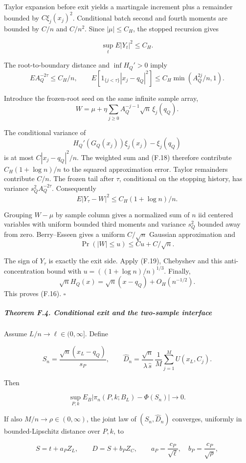 Taylor expansion before exit yields a martingale increment plus a
remainder bounded by \(C\xi_j(x_j)^2\). Conditional batch second and
fourth moments are bounded by \(C/n\) and \(C/n^2\). Since
\(|\mu|\le C_H\), the stopped recursion gives

\[
\sup_t E|Y_t|^2\le C_H.
\]

The root-to-boundary distance and \(\inf H_Q'>0\) imply \[
EA_Q^{-2\tau}\le C_H/n,\qquad
E[1_{\{j<\tau\}}|x_j-q_Q|^2]
\le C_H\min(A_Q^{2j}/n,1).
\tag{F.18}
\]

Introduce the frozen-root seed on the same infinite sample array, \[
W=\mu+\eta\sum_{j\ge0}A_Q^{-j-1}\sqrt n\,\xi_j(q_Q).
\]

The conditional variance of \[
H_Q'(G_Q(x_j))\xi_j(x_j)-\xi_j(q_Q)
\] is at most \(C|x_j-q_Q|^2/n\). The weighted sum and (F.18) therefore
contribute \(C_H(1+\log n)/n\) to the squared approximation error.
Taylor remainders contribute \(C/n\). The frozen tail after \(\tau\),
conditional on the stopping history, has variance \(s_Q^2A_Q^{-2\tau}\).
Consequently \[
E|Y_\tau-W|^2\le C_H(1+\log n)/n.
\tag{F.19}
\]

Grouping \(W-\mu\) by sample column gives a normalized sum of \(n\) iid
centered variables with uniform bounded third moments and variance
\(s_Q^2\) bounded away from zero. Berry--Esseen gives a uniform
\(C/\sqrt n\) Gaussian approximation and \[
\Pr(|W|\le u)\le Cu+C/\sqrt n.
\]

The sign of \(Y_\tau\) is exactly the exit side. Apply (F.19), Chebyshev
and this anti-concentration bound with \(u=((1+\log n)/n)^{1/3}\).
Finally, \[
\sqrt nH_Q(x)=\sqrt n(x-q_Q)+O_H(n^{-1/2}).
\] This proves (F.16). \(\square\)

\subparagraph{Theorem F.4. Conditional exit and the two-sample
interface}\label{theorem-f.4.-conditional-exit-and-the-two-sample-interface}

Assume \(L/n\to\ell\in(0,\infty]\). Define

\[
S_n=\frac{\sqrt n(x_L-q_Q)}{s_P},\qquad
\widehat D_n=
\frac{\sqrt n}{\widehat\lambda\,\widehat s}\,
\frac1M\sum_{j=1}^{M}U(x_L,C_j).
\tag{F.20}
\]

Then

\[
\sup_{P,k}E_B
\left|\pi_n(P,k;B_L)-\Phi(S_n)\right|\longrightarrow0.
\tag{F.21}
\]

If also \(M/n\to\rho\in(0,\infty)\), the joint law of
\((S_n,\widehat D_n)\) converges, uniformly in bounded-Lipschitz
distance over \(P,k\), to

\[
S=t+a_PZ_L,\qquad D=S+b_PZ_C,\qquad
a_P=\frac{c_P}{\sqrt\ell},\quad
b_P=\frac{c_P}{\sqrt\rho},
\tag{F.22}
\]

